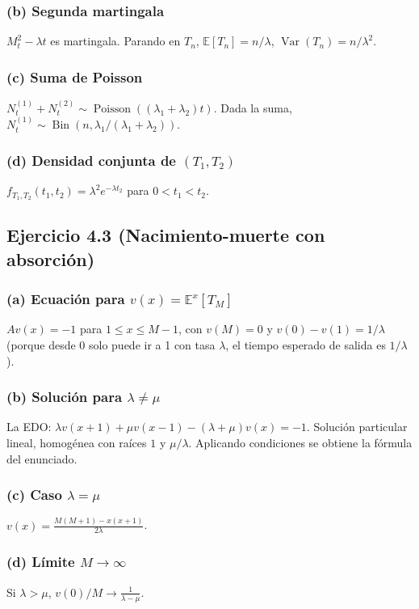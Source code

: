 \documentclass[letterpaper, 12pt]{article}
\newcommand{\E}{\mathbb{E}}
\newcommand{\1}{\mathbbm{1}}
\DeclareMathOperator{\Var}{Var}
\DeclareMathOperator{\Poisson}{Poisson}
\DeclareMathOperator{\Bin}{Bin}
\begin{document}
    \subsubsection*{(b) Segunda martingala}
    $M_t^2-\lambda t$ es martingala. Parando en $T_n$, $\E[T_n]=n/\lambda$, $\Var(T_n)=n/\lambda^2$.

    \subsubsection*{(c) Suma de Poisson}
    $N_t^{(1)}+N_t^{(2)}\sim\Poisson((\lambda_1+\lambda_2)t)$. Dada la suma, $N_t^{(1)}\sim\Bin(n,\lambda_1/(\lambda_1+\lambda_2))$.

    \subsubsection*{(d) Densidad conjunta de $(T_1,T_2)$}
    $f_{T_1,T_2}(t_1,t_2)=\lambda^2 e^{-\lambda t_2}$ para $0<t_1<t_2$.

    \subsection{Ejercicio 4.3 (Nacimiento-muerte con absorci\'on)}

    \subsubsection*{(a) Ecuaci\'on para $v(x)=\E^x[T_M]$}
    $Av(x)=-1$ para $1\le x\le M-1$, con $v(M)=0$ y $v(0)-v(1)=1/\lambda$ (porque desde 0 solo puede ir a 1 con tasa $\lambda$, el tiempo esperado de salida es $1/\lambda$).

    \subsubsection*{(b) Soluci\'on para $\lambda\neq\mu$}
    La EDO: $\lambda v(x+1)+\mu v(x-1)-(\lambda+\mu)v(x)=-1$. Soluci\'on particular lineal, homog\'enea con ra\'ices $1$ y $\mu/\lambda$. Aplicando condiciones se obtiene la f\'ormula del enunciado.

    \subsubsection*{(c) Caso $\lambda=\mu$}
    $v(x)=\frac{M(M+1)-x(x+1)}{2\lambda}$.

    \subsubsection*{(d) L\'imite $M\to\infty$}
    Si $\lambda>\mu$, $v(0)/M\to\frac{1}{\lambda-\mu}$.
\end{document}
